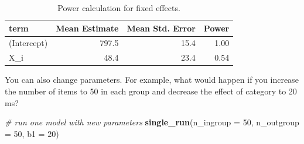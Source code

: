 \documentclass[english,doc,floatsintext]{apa6}
\newenvironment{Shaded}{\begin{snugshade}}{\end{snugshade}}
\newcommand{\CommentTok}[1]{\textcolor[rgb]{0.56,0.35,0.01}{\textit{#1}}}
\newcommand{\DataTypeTok}[1]{\textcolor[rgb]{0.13,0.29,0.53}{#1}}
\newcommand{\DecValTok}[1]{\textcolor[rgb]{0.00,0.00,0.81}{#1}}
\newcommand{\KeywordTok}[1]{\textcolor[rgb]{0.13,0.29,0.53}{\textbf{#1}}}
\newcommand{\NormalTok}[1]{#1}
\begin{document}
\begin{table}[H]

\begin{center}
\begin{threeparttable}

\caption{\label{tab:calc-power-table}Power calculation for fixed effects.}

\begin{tabular}{lrrr}
\toprule
term & \multicolumn{1}{c}{Mean Estimate} & \multicolumn{1}{c}{Mean Std. Error} & \multicolumn{1}{c}{Power}\\
\midrule
(Intercept) & 797.5 & 15.4 & 1.00\\
X\_i & 48.4 & 23.4 & 0.54\\
\bottomrule
\end{tabular}

\end{threeparttable}
\end{center}

\end{table}

You can also change parameters. For example, what would happen if you increase the number of items to 50 in each group and decrease the effect of category to 20 ms?

\begin{Shaded}
\begin{Highlighting}[]
\CommentTok{# run one model with new parameters}
\KeywordTok{single_run}\NormalTok{(}\DataTypeTok{n_ingroup =} \DecValTok{50}\NormalTok{, }\DataTypeTok{n_outgroup =} \DecValTok{50}\NormalTok{, }\DataTypeTok{b1 =} \DecValTok{20}\NormalTok{)}
\end{Highlighting}
\end{Shaded}
\end{document}

